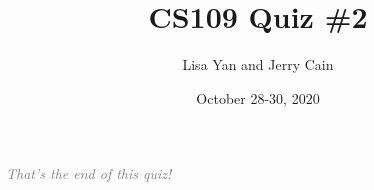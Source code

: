 \documentclass[12pt]{article}
\title{CS109 Quiz \#2}
\author{Lisa Yan and Jerry Cain}
\date{October 28-30, 2020}
\begin{document}











\vfill
\begin{center}
\textcolor{gray}{\textit{That's the end of this quiz!}}
\end{center}
\end{document}
